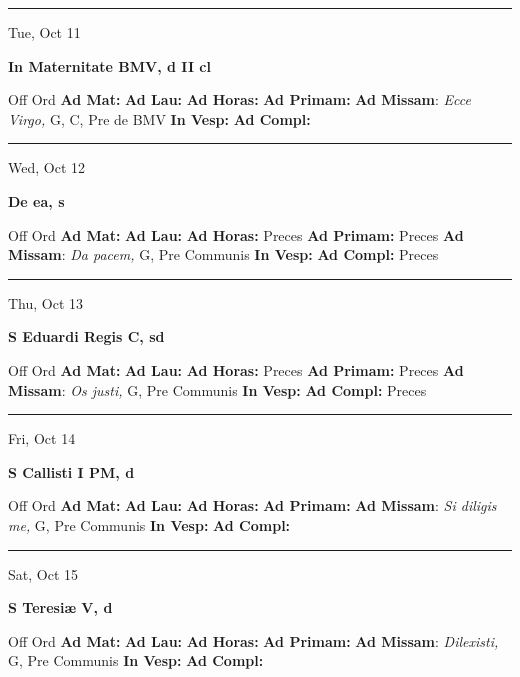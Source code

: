 \documentclass[letterpaper, 10pt]{article}
\begin{document}
\hrule
\begin{center}
Tue, Oct 11
\end{center}\textbf{ \large In Maternitate BMV, \textnormal{\normalsize d II cl}}
\begin{justify}
Off Ord
\textbf{Ad Mat: }
\textbf{Ad Lau: }
\textbf{Ad Horas: }
\textbf{Ad Primam: }
\textbf{Ad Missam}: \textit{Ecce Virgo,} G, C, Pre de BMV
\textbf{In Vesp: }
\textbf{Ad Compl: }\end{justify}



\hrule
\begin{center}
Wed, Oct 12
\end{center}\textbf{ \large De ea, \textnormal{\normalsize s}}
\begin{justify}
Off Ord
\textbf{Ad Mat: }
\textbf{Ad Lau: }
\textbf{Ad Horas: }Preces
\textbf{Ad Primam: }Preces
\textbf{Ad Missam}: \textit{Da pacem,} G, Pre Communis
\textbf{In Vesp: }
\textbf{Ad Compl: }Preces\end{justify}



\hrule
\begin{center}
Thu, Oct 13
\end{center}\textbf{ \large S Eduardi Regis C, \textnormal{\normalsize sd}}
\begin{justify}
Off Ord
\textbf{Ad Mat: }
\textbf{Ad Lau: }
\textbf{Ad Horas: }Preces
\textbf{Ad Primam: }Preces
\textbf{Ad Missam}: \textit{Os justi,} G, Pre Communis
\textbf{In Vesp: }
\textbf{Ad Compl: }Preces\end{justify}



\hrule
\begin{center}
Fri, Oct 14
\end{center}\textbf{ \large S Callisti I PM, \textnormal{\normalsize d}}
\begin{justify}
Off Ord
\textbf{Ad Mat: }
\textbf{Ad Lau: }
\textbf{Ad Horas: }
\textbf{Ad Primam: }
\textbf{Ad Missam}: \textit{Si diligis me,} G, Pre Communis
\textbf{In Vesp: }
\textbf{Ad Compl: }\end{justify}



\hrule
\begin{center}
Sat, Oct 15
\end{center}\textbf{ \large S Teresiæ V, \textnormal{\normalsize d}}
\begin{justify}
Off Ord
\textbf{Ad Mat: }
\textbf{Ad Lau: }
\textbf{Ad Horas: }
\textbf{Ad Primam: }
\textbf{Ad Missam}: \textit{Dilexisti,} G, Pre Communis
\textbf{In Vesp: }
\textbf{Ad Compl: }\end{justify}
\end{document}
